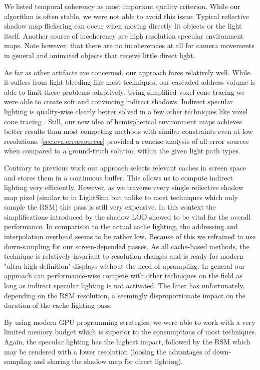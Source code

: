 \documentclass[thesis.tex]{subfiles}
\begin{document}
We listed temporal coherency as most important quality criterion.
While our algorithm is often stable, we were not able to avoid this issue:
Typical reflective shadow map flickering can occur when moving directly lit objects or the light itself.
Another source of incoherency are high resolution specular environment maps.
Note however, that there are no incoherencies at all for camera movements in general and animated objects that receive little direct light.

As far as other artifacts are concerned, our approach fares relatively well.
While it suffers from light bleeding like most techniques, our cascaded address volume is able to limit these problems adaptively.
Using simplified voxel cone tracing we were able to create soft and convincing indirect shadows.
Indirect specular lighting is quality-wise clearly better solved in a few other techniques like voxel cone tracing \cite{bib:voxelconetracing}.
Still, our new idea of hemispherical environment maps achieves better results than most competing methods with similar constraints even at low resolutions.
\autoref{sec:eva:errorsources} provided a concise analysis of all error sources when compared to a ground-truth solution within the given light path types.

Contrary to previous work our approach selects relevant caches in screen space and stores them in a continuous buffer.
This allows us to compute indirect lighting very efficiently.
However, as we traverse every single reflective shadow map pixel (similar to in LightSkin \cite{bib:LightskinPaper} but unlike to most techniques which only sample the RSM) this pass is still very expensive.
In this context the simplifications introduced by the shadow LOD showed to be vital for the overall performance.
In comparison to the actual cache lighting, the addressing and interpolation overhead seems to be rather low.
Because of this we refrained to use down-sampling for our screen-depended passes.
As all cache-based methods, the technique is relatively invariant to resolution changes and is ready for modern "ultra  high definition" displays without the need of upsampling.
In general our approach can performance-wise compete with other techniques on the field as long as indirect specular lighting is not activated.
The later has unfortunately, depending on the RSM resolution, a seemingly disproportionate impact on the duration of the cache lighting pass.

By using modern GPU programming strategies, we were able to work with a very limited memory budget which is superior to the consumptions of most techniques.
Again, the specular lighting has the highest impact, followed by the RSM which may be rendered with a lower resolution (loosing the advantages of down-sampling and sharing the shadow map for direct lighting).
\end{document}

